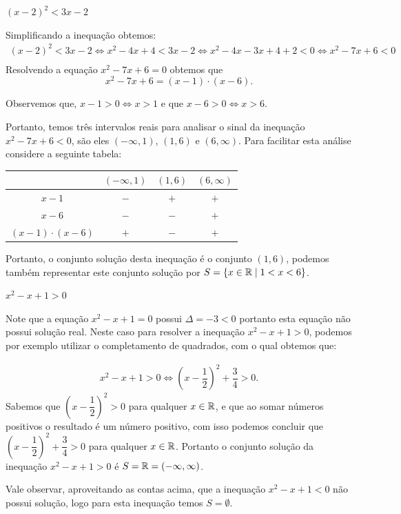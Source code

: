  \begin{exem}
 $(x-2)^2 < 3x -2$
 
 Simplificando a inequação obtemos:
 \begin{eqnarray*}
 (x-2)^2 < 3x -2 \Leftrightarrow x^2 -4x + 4 < 3x - 2 \Leftrightarrow x^2-4x-3x+4+2<0 \Leftrightarrow x^2-7x+6<0 \\
 \end{eqnarray*}
  Resolvendo a equação $x^2-7x+6= 0$ obtemos que
\begin{equation}
x^2-7x+6 = (x-1) \cdot (x-6) . 
\end{equation}
 
 Observemos que, $x-1> 0 \Leftrightarrow x>1$ e que $x-6> 0 \Leftrightarrow x >6$. 
 
 Portanto, temos três intervalos reais para analisar o sinal da inequação $x^2-7x+6 < 0$, são eles $(-\infty, 1)$, $\left(1, 6 \right)$ e $\left(6, \infty\right)$. Para facilitar esta análise considere a seguinte tabela:
 
 \begin{table}[H]
 \centering
 \begin{tabular}{|c|c|c|c|} \hline
 \rowcolor{cinza}
    & $(-\infty, 1)$ & $\left(1, 6 \right)$ & $\left(6, \infty \right)$ \\ \hline
                $x-1$ & $-$             & $+$       & $+$ \\ \hline
                $x-6$ & $-$             & $-$       & $+$ \\ \hline
  $(x-1) \cdot (x-6)$ & $+$             & $-$       & $+$ \\ \hline
 \end{tabular}
 \end{table}
 
 Portanto, o conjunto solução desta inequação é o conjunto $(1 , 6)$, podemos também representar este conjunto solução por $S= \left\{ x \in \mathbb{R} \mid 1 < x < 6 \right\}$.
 \end{exem}
 
 \begin{exem}
 $x^2-x+1>0$
 
 Note que a equação $x^2-x+1= 0$ possui $\Delta= -3 < 0$ portanto esta equação não possui solução real. Neste caso para resolver a inequação $x^2-x+1>0$, podemos por exemplo utilizar o completamento de quadrados, com o qual obtemos que:

 \begin{eqnarray*}
 x^2-x+1>0 \Leftrightarrow \left(x - \dfrac{1}{2} \right)^2 + \dfrac{3}{4} > 0.
 \end{eqnarray*}
 Sabemos que $\left(x - \dfrac{1}{2} \right)^2 > 0$ para qualquer $x \in \mathbb{R}$, e que ao somar números positivos o resultado é um número positivo, com isso podemos concluir que $\left(x - \dfrac{1}{2} \right)^2 + \dfrac{3}{4} > 0$ para qualquer $x \in \mathbb{R}$. Portanto o conjunto solução da inequação $x^2-x+1>0$ é $S= \mathbb{R}= (-\infty, \infty)$.
 
 Vale observar, aproveitando as contas acima, que a inequação $x^2-x+1<0$ não possui solução, logo para esta inequação temos $S= \emptyset$.
 
 \end{exem}
 
